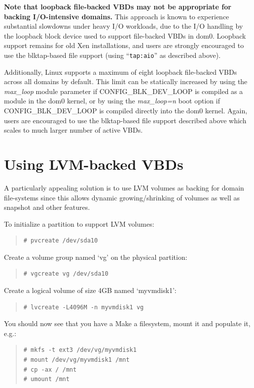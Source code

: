\documentclass[11pt,twoside,final,openright]{report}
\begin{document}
{\bf Note that loopback file-backed VBDs may not be appropriate for backing
  I/O-intensive domains.}  This approach is known to experience
substantial slowdowns under heavy I/O workloads, due to the I/O
handling by the loopback block device used to support file-backed VBDs
in dom0.  Loopback support remains for old Xen installations, and users
are strongly encouraged to use the blktap-based file support (using 
``{\tt{tap:aio}}'' as described above).

Additionally, Linux supports a maximum of eight loopback file-backed 
VBDs across all domains by default.  This limit can be statically 
increased by using the \emph{max\_loop} module parameter if 
CONFIG\_BLK\_DEV\_LOOP is compiled as a module in the dom0 kernel, or 
by using the \emph{max\_loop=n} boot option if CONFIG\_BLK\_DEV\_LOOP 
is compiled directly into the dom0 kernel.  Again, users are encouraged
to use the blktap-based file support described above which scales to much 
larger number of active VBDs.


\section{Using LVM-backed VBDs}
\label{s:using-lvm-backed-vbds}

A particularly appealing solution is to use LVM volumes as backing for
domain file-systems since this allows dynamic growing/shrinking of
volumes as well as snapshot and other features.

To initialize a partition to support LVM volumes:
\begin{quote}
\begin{verbatim}
# pvcreate /dev/sda10           
\end{verbatim} 
\end{quote}

Create a volume group named `vg' on the physical partition:
\begin{quote}
\begin{verbatim}
# vgcreate vg /dev/sda10
\end{verbatim} 
\end{quote}

Create a logical volume of size 4GB named `myvmdisk1':
\begin{quote}
\begin{verbatim}
# lvcreate -L4096M -n myvmdisk1 vg
\end{verbatim}
\end{quote}

You should now see that you have a  Make a
filesystem, mount it and populate it, e.g.:
\begin{quote}
\begin{verbatim}
# mkfs -t ext3 /dev/vg/myvmdisk1
# mount /dev/vg/myvmdisk1 /mnt
# cp -ax / /mnt
# umount /mnt
\end{verbatim}
\end{quote}
\end{document}
